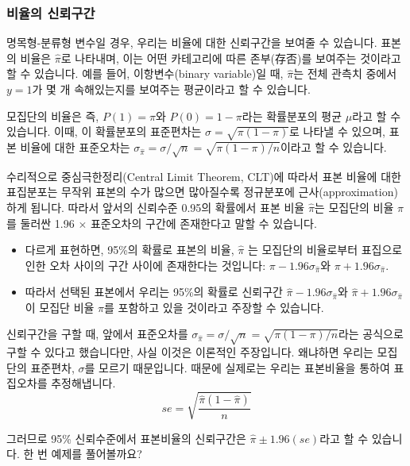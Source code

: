 \documentclass[]{book}
\begin{document}
\hypertarget{uxbe44uxc728uxc758-uxc2e0uxb8b0uxad6cuxac04}{%
\subsubsection{비율의 신뢰구간}\label{uxbe44uxc728uxc758-uxc2e0uxb8b0uxad6cuxac04}}

명목형-분류형 변수일 경우, 우리는 비율에 대한 신뢰구간을 보여줄 수 있습니다. 표본의 비율은 \(\hat{\pi}\)로 나타내며, 이는 어떤 카테고리에 따른 존부(存否)를 보여주는 것이라고 할 수 있습니다. 예를 들어, 이항변수(binary variable)일 때, \(\hat{\pi}\)는 전체 관측치 중에서 \(y = 1\)가 몇 개 속해있는지를 보여주는 평균이라고 할 수 있습니다.

모집단의 비율은 즉, \(P(1) = \pi\)와 \(P(0) = 1-\pi\)라는 확률분포의 평균 \(\mu\)라고 할 수 있습니다. 이때, 이 확률분포의 표준편차는 \(\sigma = \sqrt{\pi(1-\pi)}\)로 나타낼 수 있으며, 표본 비율에 대한 표준오차는 \(\sigma_{\hat{\pi}} = \sigma / \sqrt{n} = \sqrt{\pi(1-\pi)/n}\)이라고 할 수 있습니다.

수리적으로 중심극한정리(Central Limit Theorem, CLT)에 따라서 표본 비율에 대한 표집분포는 무작위 표본의 수가 많으면 많아질수록 정규분포에 근사(approximation)하게 됩니다. 따라서 앞서의 신뢰수준 0.95의 확률에서 표본 비율 \(\hat{\pi}\)는 모집단의 비율 \(\pi\)를 둘러싼 1.96 \(\times\) 표준오차의 구간에 존재한다고 말할 수 있습니다.

\begin{itemize}
\item
  다르게 표현하면, 95\%의 확률로 표본의 비율, \(\hat{\pi}\) 는 모집단의 비율로부터 표집으로 인한 오차 사이의 구간 사이에 존재한다는 것입니다: \(\pi - 1.96\sigma_{\hat{\pi}}\)와 \(\pi + 1.96\sigma_{\hat{\pi}}\).
\item
  따라서 선택된 표본에서 우리는 95\%의 확률로 신뢰구간 \(\hat{\pi} - 1.96\sigma_{\hat{\pi}}\)와 \(\hat{\pi} + 1.96\sigma_{\hat{\pi}}\)이 모집단 비율 \(\pi\)를 포함하고 있을 것이라고 주장할 수 있습니다.
\end{itemize}

신뢰구간을 구할 때, 앞에서 표준오차를 \(\sigma_{\hat{\pi}} = \sigma / \sqrt{n} = \sqrt{\pi(1-\pi)/n}\)라는 공식으로 구할 수 있다고 했습니다만, 사실 이것은 이론적인 주장입니다. 왜냐하면 우리는 모집단의 표준편차, \(\sigma\)를 모르기 때문입니다. 때문에 실제로는 우리는 표본비율을 통하여 표집오차를 추정해냅니다. \[se = \sqrt{\frac{\hat{\pi}(1-\hat{\pi})}{n}}\]

그러므로 95\% 신뢰수준에서 표본비율의 신뢰구간은 \(\hat{\pi}\pm 1.96(se)\)라고 할 수 있습니다. 한 번 예제를 풀어볼까요?
\end{document}
